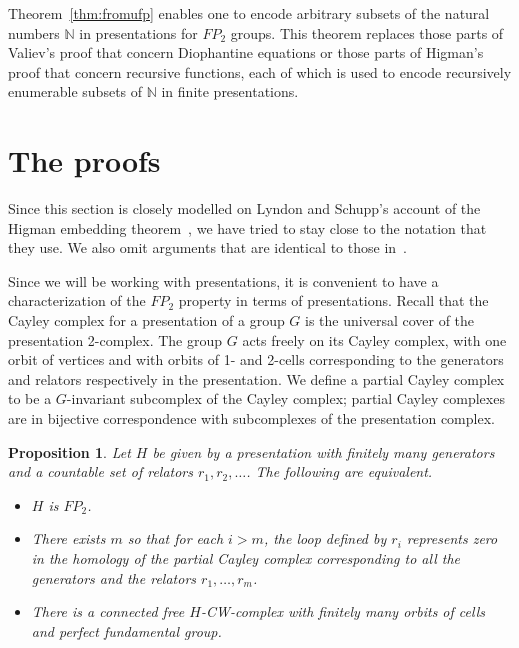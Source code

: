\documentclass[12pt,a4paper]{article}
\newtheorem{proposition}[theorem]{Proposition}
\newcommand{\nn}{{\mathbb N}}
\begin{document}
Theorem~\ref{thm:fromufp} enables one to encode arbitrary subsets of
the natural numbers $\nn$ in presentations for $FP_2$ groups.  This
theorem replaces those parts of Valiev's proof that concern
Diophantine equations or those parts of Higman's proof that concern
recursive functions, each of which is used to encode recursively
enumerable subsets of $\nn$ in finite presentations.




\section{The proofs} 

Since this section is closely modelled on Lyndon and Schupp's 
account of the Higman embedding theorem~\cite[Sec.~IV.7]{lynsch}, 
we have tried to stay close to the notation that they use.  We 
also omit arguments that are identical to those in~\cite{lynsch}.  

Since we will be working with presentations, it is convenient to 
have a characterization of the $FP_2$ property in terms of presentations.  
Recall that the Cayley complex for a presentation of a group $G$ is the 
universal cover of the presentation 2-complex.  The group $G$ acts 
freely on its Cayley complex, with one orbit of vertices and with 
orbits of 1- and 2-cells corresponding to the generators and relators 
respectively in the presentation.  We define a partial Cayley complex
to be a $G$-invariant subcomplex of the Cayley complex; partial 
Cayley complexes are in bijective correspondence with subcomplexes of
the presentation complex.  

\begin{proposition}\label{prop:fp2}
Let $H$ be given by a presentation with finitely many 
generators and a countable set of relators $r_1,r_2,\ldots$.  
The following are equivalent.  
\begin{itemize} 
\item[(i)] $H$ is $FP_2$.  
\item[(ii)] There exists $m$ so that 
for each $i>m$, the loop defined by $r_i$ represents zero in 
the homology of the partial Cayley complex corresponding to 
all the generators and the relators $r_1,\ldots,r_m$.  
\item[(iii)] There is a connected free $H$-CW-complex with finitely 
many orbits of cells and perfect fundamental group.  
\end{itemize}
\end{proposition} 
\end{document}
